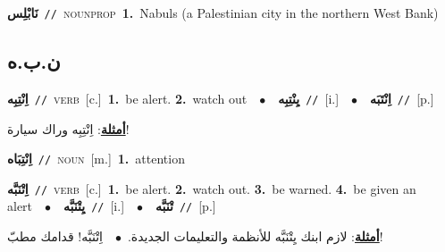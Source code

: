 \documentclass[10pt,a4paper,twoside]{article} %
\begin{document}
\begin{multicols}{2}
{{{{{{\setlength\topsep{0pt}\textbf{\foreignlanguage{arabic}{نَابْلِس}}\ {\color{gray}\texttt{//}\color{black}}\ \textsc{noun\textunderscore prop}\ \textbf{1.}~Nabuls (a Palestinian city in the northern West Bank)\ 

\vspace{-3mm}
\subsection*{\color{blue}\foreignlanguage{arabic}{ن.ب.ه}\color{blue}{}} 

{\setlength\topsep{0pt}\textbf{\foreignlanguage{arabic}{اِنْتِبِه}}\ {\color{gray}\texttt{//}\color{black}}\ \textsc{verb}\ [c.]\ \textbf{1.}~be alert.  \textbf{2.}~watch out\ \ $\bullet$\ \ \setlength\topsep{0pt}\textbf{\foreignlanguage{arabic}{يِنْتِبِه}}\ {\color{gray}\texttt{//}\color{black}}\ [i.]\ \ $\bullet$\ \ \setlength\topsep{0pt}\textbf{\foreignlanguage{arabic}{اِنْتَبَه}}\ {\color{gray}\texttt{//}\color{black}}\ [p.]\  \begin{flushright}\color{gray}\foreignlanguage{arabic}{\textbf{\underline{\foreignlanguage{arabic}{أمثلة}}}: اِنْتِبِه وراك سيارة!}\end{flushright}\color{black}} \vspace{2mm}

{\setlength\topsep{0pt}\textbf{\foreignlanguage{arabic}{اِنْتِبَاه}}\ {\color{gray}\texttt{//}\color{black}}\ \textsc{noun}\ [m.]\ \textbf{1.}~attention\ 

{\setlength\topsep{0pt}\textbf{\foreignlanguage{arabic}{اِتْنَبَّه}}\ {\color{gray}\texttt{//}\color{black}}\ \textsc{verb}\ [c.]\ \textbf{1.}~be alert.  \textbf{2.}~watch out.  \textbf{3.}~be warned.  \textbf{4.}~be given an alert\ \ $\bullet$\ \ \setlength\topsep{0pt}\textbf{\foreignlanguage{arabic}{يِتْنَبَّه}}\ {\color{gray}\texttt{//}\color{black}}\ [i.]\ \ $\bullet$\ \ \setlength\topsep{0pt}\textbf{\foreignlanguage{arabic}{تْنَبَّه}}\ {\color{gray}\texttt{//}\color{black}}\ [p.]\  \begin{flushright}\color{gray}\foreignlanguage{arabic}{\textbf{\underline{\foreignlanguage{arabic}{أمثلة}}}: لازم ابنك يِتْنَبَّه للأنظمة والتعليمات الجديدة.\ $\bullet$\ \  اِتْنَبَّه! قدامك مطبّ!}\end{flushright}\color{black}} \vspace{2mm}

}}}}}}}
\end{multicols}
\end{document}
